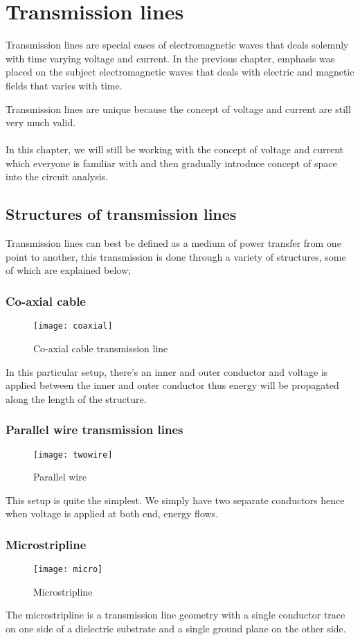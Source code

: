 \chapter{Transmission lines}
Transmission lines are special cases of electromagnetic waves that deals solemnly with time varying voltage and current. In the previous chapter, emphasis was placed on the subject electromagnetic waves that deals with electric and magnetic fields that varies with time.

Transmission lines are unique because the concept of voltage and current are still very much valid.\\\\
In this chapter, we will still be working with the concept of voltage and current which everyone is familiar with and then gradually introduce concept of space into the circuit analysis. 
	
\section{Structures of transmission lines}
Transmission lines can best be defined as a medium of power transfer from one point to another, this transmission is done through a variety of structures, some of which are explained below;
	
	\subsection{Co-axial cable}	
		\begin{figure}[h]
		\centering
		\texttt{[image: coaxial]}
		\caption{Co-axial cable transmission line}
	\end{figure}
	 In this particular setup, there’s an inner and outer conductor and voltage is applied between the inner and outer conductor thus energy will be propagated along the length of the structure.
	\subsection{Parallel wire transmission lines}
  	    \begin{figure}[h]
		\centering
		\texttt{[image: twowire]}
		\caption{Parallel wire}
	\end{figure}
	This setup is quite the simplest. We simply have two separate conductors hence when voltage is applied at both end, energy flows.
	\subsection{Microstripline}
	\begin{figure}[h]
		\centering
		\texttt{[image: micro]}
		\caption{Microstripline }
	\end{figure}
The microstripline is a transmission line geometry with a single conductor trace on one side of a dielectric  substrate and a single ground plane on the other side.
